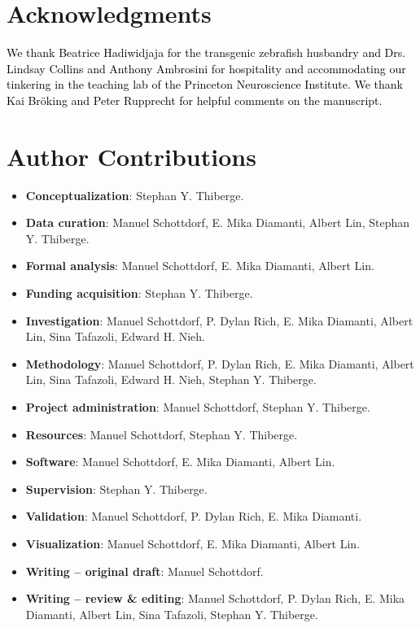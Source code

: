 \documentclass[10pt,letterpaper]{article}
\begin{document}
\section*{Acknowledgments}
\textcolor{black}{We thank Beatrice Hadiwidjaja for the transgenic zebrafish husbandry and Drs. Lindsay Collins and Anthony Ambrosini for hospitality and accommodating our tinkering in the teaching lab of the Princeton Neuroscience Institute. We thank Kai Br\"oking and Peter Rupprecht for helpful comments on the manuscript.}

\section*{Author Contributions}
\begin{itemize}
    \item \textbf{Conceptualization}: Stephan Y. Thiberge.
    \item \textbf{Data curation}: Manuel Schottdorf, E. Mika Diamanti, Albert Lin, Stephan Y. Thiberge.
    \item \textbf{Formal analysis}: Manuel Schottdorf, E. Mika Diamanti, Albert Lin.
    \item \textbf{Funding acquisition}: Stephan Y. Thiberge.
    \item \textbf{Investigation}: Manuel Schottdorf, P. Dylan Rich, E. Mika Diamanti, Albert Lin, Sina Tafazoli, Edward H. Nieh.
    \item \textbf{Methodology}: Manuel Schottdorf, P. Dylan Rich, E. Mika Diamanti, Albert Lin, Sina Tafazoli, Edward H. Nieh, Stephan Y. Thiberge. 
    \item \textbf{Project administration}: Manuel Schottdorf, Stephan Y. Thiberge.
    \item \textbf{Resources}: Manuel Schottdorf, Stephan Y. Thiberge.
    \item \textbf{Software}: Manuel Schottdorf, E. Mika Diamanti, Albert Lin.
    \item \textbf{Supervision}: Stephan Y. Thiberge.
    \item \textbf{Validation}: Manuel Schottdorf, P. Dylan Rich, E. Mika Diamanti.
    \item \textbf{Visualization}: Manuel Schottdorf, E. Mika Diamanti, Albert Lin.
    \item \textbf{Writing – original draft}: Manuel Schottdorf.
    \item \textbf{Writing – review \& editing}: Manuel Schottdorf, P. Dylan Rich, E. Mika Diamanti, Albert Lin, Sina Tafazoli, Stephan Y. Thiberge.
\end{itemize}
\end{document}
